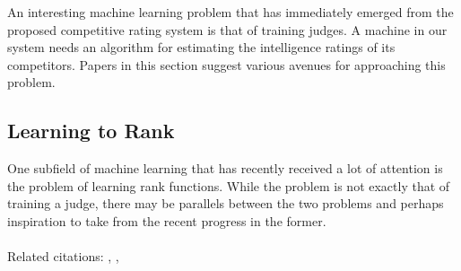 \documentclass{article} %
\begin{document}
An interesting machine learning problem that has immediately emerged from the proposed competitive rating system is that of training judges. A machine in our system needs an algorithm for estimating the intelligence ratings of its competitors. Papers in this section suggest various avenues for approaching this problem.

\subsection{Learning to Rank}

One subfield of machine learning that has recently received a lot of attention is the problem of learning rank functions. While the problem is not exactly that of training a judge, there may be parallels between the two problems and perhaps inspiration to take from the recent progress in the former.
\\
\\ Related citations:  \cite{valizadegan2009learning}, \cite{chapelle2011yahoo}, \cite{cao2007learning}


%

\end{document}
